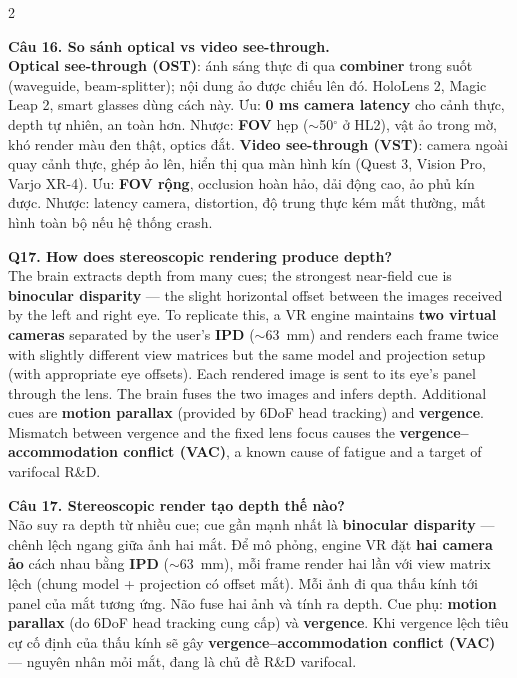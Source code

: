\begin{paracol}{2}
\switchcolumn

\textbf{Câu 16. So sánh optical vs video see-through.}\\
\textbf{Optical see-through (OST)}: ánh sáng thực đi qua \textbf{combiner} trong suốt (waveguide, beam-splitter); nội dung ảo được chiếu lên đó. HoloLens 2, Magic Leap 2, smart glasses dùng cách này. Ưu: \textbf{0 ms camera latency} cho cảnh thực, depth tự nhiên, an toàn hơn. Nhược: \textbf{FOV} hẹp ($\sim$50$^\circ$ ở HL2), vật ảo trong mờ, khó render màu đen thật, optics đắt. \textbf{Video see-through (VST)}: camera ngoài quay cảnh thực, ghép ảo lên, hiển thị qua màn hình kín (Quest 3, Vision Pro, Varjo XR-4). Ưu: \textbf{FOV rộng}, occlusion hoàn hảo, dải động cao, ảo phủ kín được. Nhược: latency camera, distortion, độ trung thực kém mắt thường, mất hình toàn bộ nếu hệ thống crash.

\switchcolumn*

\textbf{Q17. How does stereoscopic rendering produce depth?}\\
The brain extracts depth from many cues; the strongest near-field cue is \textbf{binocular disparity} --- the slight horizontal offset between the images received by the left and right eye. To replicate this, a VR engine maintains \textbf{two virtual cameras} separated by the user's \textbf{IPD} ($\sim$63~mm) and renders each frame twice with slightly different view matrices but the same model and projection setup (with appropriate eye offsets). Each rendered image is sent to its eye's panel through the lens. The brain fuses the two images and infers depth. Additional cues are \textbf{motion parallax} (provided by 6DoF head tracking) and \textbf{vergence}. Mismatch between vergence and the fixed lens focus causes the \textbf{vergence--accommodation conflict (VAC)}, a known cause of fatigue and a target of varifocal R\&D.

\switchcolumn

\textbf{Câu 17. Stereoscopic render tạo depth thế nào?}\\
Não suy ra depth từ nhiều cue; cue gần mạnh nhất là \textbf{binocular disparity} --- chênh lệch ngang giữa ảnh hai mắt. Để mô phỏng, engine VR đặt \textbf{hai camera ảo} cách nhau bằng \textbf{IPD} ($\sim$63~mm), mỗi frame render hai lần với view matrix lệch (chung model + projection có offset mắt). Mỗi ảnh đi qua thấu kính tới panel của mắt tương ứng. Não fuse hai ảnh và tính ra depth. Cue phụ: \textbf{motion parallax} (do 6DoF head tracking cung cấp) và \textbf{vergence}. Khi vergence lệch tiêu cự cố định của thấu kính sẽ gây \textbf{vergence--accommodation conflict (VAC)} --- nguyên nhân mỏi mắt, đang là chủ đề R\&D varifocal.


\end{paracol}
